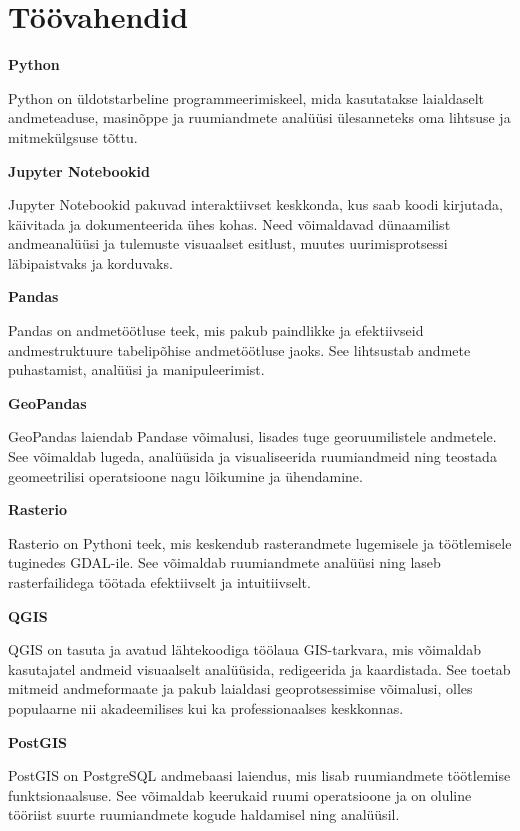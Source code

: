 \section{Töövahendid}


\textbf{Python}

Python on üldotstarbeline programmeerimiskeel, mida kasutatakse
laialdaselt andmeteaduse, masinõppe ja ruumiandmete analüüsi ülesanneteks
oma lihtsuse ja mitmekülgsuse tõttu.



\textbf{Jupyter Notebookid}\nopagebreak[4]

Jupyter Notebookid pakuvad interaktiivset keskkonda, kus
saab koodi kirjutada, käivitada ja dokumenteerida ühes kohas. Need võimaldavad
dünaamilist andmeanalüüsi ja tulemuste visuaalset esitlust, muutes
uurimisprotsessi läbipaistvaks ja korduvaks.



\textbf{Pandas}\nopagebreak[4]

Pandas on andmetöötluse teek, mis pakub paindlikke ja
efektiivseid andmestruktuure tabelipõhise andmetöötluse jaoks. See lihtsustab
andmete puhastamist, analüüsi ja manipuleerimist.


\textbf{GeoPandas}\nopagebreak[4]

GeoPandas laiendab Pandase võimalusi, lisades tuge georuumilistele
andmetele. See võimaldab lugeda, analüüsida ja visualiseerida
ruumiandmeid ning teostada geomeetrilisi operatsioone nagu lõikumine ja
ühendamine.


\textbf{Rasterio}\nopagebreak[4]

Rasterio on Pythoni teek, mis keskendub rasterandmete lugemisele
ja töötlemisele tuginedes GDAL-ile. See võimaldab ruumiandmete analüüsi
ning laseb rasterfailidega töötada efektiivselt ja intuitiivselt.

\textbf{QGIS}\nopagebreak[4]

QGIS on tasuta ja avatud lähtekoodiga töölaua GIS-tarkvara, mis võimaldab
kasutajatel andmeid visuaalselt analüüsida, redigeerida ja kaardistada. See
toetab mitmeid andmeformaate ja pakub laialdasi geoprotsessimise võimalusi,
olles populaarne nii akadeemilises kui ka professionaalses keskkonnas.


\textbf{PostGIS}\nopagebreak[4]

PostGIS on PostgreSQL andmebaasi laiendus, mis lisab ruumiandmete töötlemise funktsionaalsuse. See võimaldab keerukaid ruumi operatsioone
ja on oluline tööriist suurte ruumiandmete kogude haldamisel ning
analüüsil.

